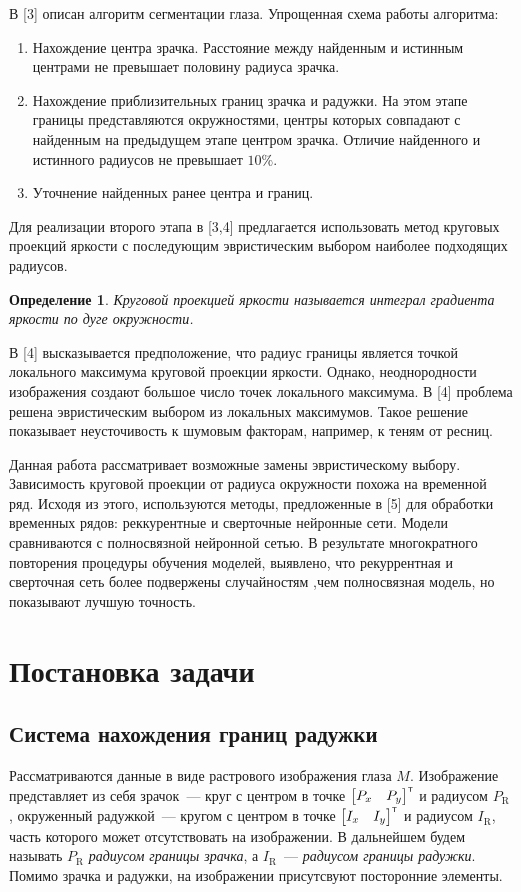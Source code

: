 \documentclass[12pt, twoside]{article}
\newtheorem{definition}{Определение}
\begin{document}
В [3] описан алгоритм сегментации глаза. Упрощенная схема работы алгоритма:
\begin{enumerate}
	\item Нахождение центра зрачка.
	 Расстояние между найденным и истинным центрами не превышает половину радиуса зрачка.
	\item Нахождение приблизительных границ зрачка и радужки.
	На этом этапе границы представляются окружностями, центры которых совпадают с найденным на предыдущем этапе центром зрачка. Отличие найденного и истинного радиусов не превышает $10\%$.
	
	\item Уточнение найденных ранее центра и границ.
\end{enumerate}
Для реализации второго этапа в [3,4] предлагается использовать метод круговых проекций яркости с последующим эвристическим выбором наиболее подходящих радиусов.
\begin{definition}\label{def:proj}
\emph{Круговой проекцией яркости} называется интеграл градиента яркости по дуге окружности.
\end{definition}
В [4] высказывается предположение, что радиус границы является точкой локального максимума круговой проекции яркости. Однако, неоднородности изображения создают большое число точек локального максимума. В [4] проблема решена эвристическим выбором из локальных максимумов. Такое решение показывает неусточивость к шумовым факторам, например, к теням от ресниц.

Данная работа рассматривает возможные замены эвристическому выбору. Зависимость круговой проекции от радиуса окружности похожа на временной ряд. Исходя из этого, используются методы, предложенные в [5] для обработки временных рядов: реккурентные и сверточные нейронные сети. Модели сравниваются с полносвязной нейронной сетью. В результате многократного повторения процедуры обучения моделей, выявлено, что рекуррентная и сверточная сеть более подвержены случайностям ,чем полносвязная модель, но показывают лучшую точность.

\section{Постановка задачи}
\subsection{Система нахождения границ радужки}

Рассматриваются данные в виде растрового изображения глаза $M$. Изображение представляет из себя зрачок~--- круг с центром в точке $\begin{bmatrix}P_x & P_y\end{bmatrix}^{\text{\tiny\sffamily\upshape\mdseries T}}$ и радиусом $P_\text{R}$, окруженный радужкой~--- кругом с центром в точке $\begin{bmatrix}I_x & I_y\end{bmatrix}^{\text{\tiny\sffamily\upshape\mdseries T}}$ и радиусом $I_\text{R}$, часть которого может отсутствовать на изображении. В дальнейшем будем называть $P_\text{R}$ \textit{радиусом границы зрачка}, а $I_\text{R}$~--- \textit{радиусом границы радужки}. Помимо зрачка и радужки, на изображении присутсвуют посторонние элементы.
\end{document}
